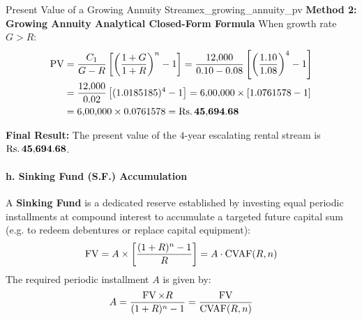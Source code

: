 \begin{example}{Present Value of a Growing Annuity Stream}{ex_growing_annuity_pv}
\textbf{Method 2: Growing Annuity Analytical Closed-Form Formula}
When growth rate $G > R$:
\begin{align*}
    \operatorname{PV} &= \frac{C_1}{G - R} \left[ \left(\frac{1 + G}{1 + R}\right)^n - 1 \right] = \frac{12{,}000}{0.10 - 0.08} \left[ \left(\frac{1.10}{1.08}\right)^4 - 1 \right] \\
    &= \frac{12{,}000}{0.02} \left[ (1.0185185)^4 - 1 \right] = 6{,}00{,}000 \times [1.0761578 - 1] \\
    &= 6{,}00{,}000 \times 0.0761578 = \mathbf{\text{Rs.}\, 45{,}694.68}
\end{align*}

\textbf{Final Result:}
The present value of the $4$-year escalating rental stream is $\mathbf{\text{Rs.}\, 45{,}694.68}$.
\end{example}

\begin{formulabox}
\paragraph{h. Sinking Fund (S.F.) Accumulation}
A \textbf{Sinking Fund} is a dedicated reserve established by investing equal periodic installments at compound interest to accumulate a targeted future capital sum (e.g. to redeem debentures or replace capital equipment):
\begin{equation}
    \operatorname{FV} = A \times \left[ \frac{(1 + R)^n - 1}{R} \right] = A \cdot \operatorname{CVAF}(R, n)
\end{equation}
The required periodic installment $A$ is given by:
\begin{equation}
    A = \frac{\operatorname{FV} \times R}{(1 + R)^n - 1} = \frac{\operatorname{FV}}{\operatorname{CVAF}(R, n)}
\end{equation}
\end{formulabox}

